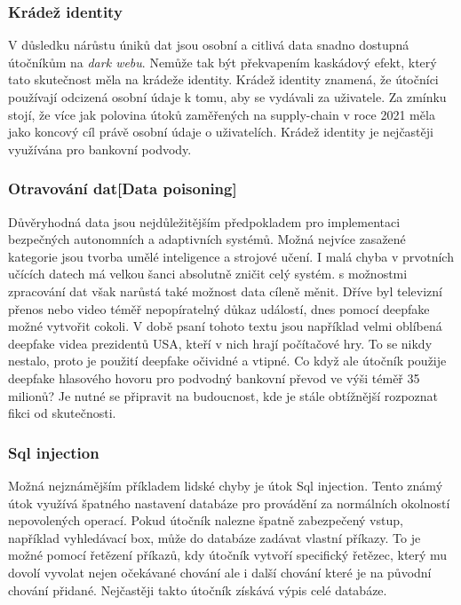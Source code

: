 \subsubsection{Krádež identity}
V důsledku nárůstu úniků dat jsou osobní a citlivá data snadno dostupná útočníkům na \textit{dark webu}.
Nemůže tak být překvapením kaskádový efekt, který tato skutečnost měla na krádeže identity.
Krádež identity znamená, že útočníci používají odcizená osobní údaje k tomu, aby se vydávali za uživatele.
Za zmínku stojí, že více jak polovina útoků zaměřených na supply-chain v roce 2021 měla jako koncový cíl právě osobní údaje o uživatelích.
Krádež identity je nejčastěji využívána pro bankovní podvody.\cite{Enisa_thread_landscape}

\subsubsection{Otravování dat[Data poisoning]}
Důvěryhodná data jsou nejdůležitějším předpokladem pro implementaci bezpečných autonomních a adaptivních systémů.
Možná nejvíce zasažené kategorie jsou tvorba umělé inteligence a strojové učení.
I malá chyba v prvotních učících datech má velkou šanci absolutně zničit celý systém.
s možnostmi zpracování dat však narůstá také možnost data cíleně měnit.
Dříve byl televizní přenos nebo video téměř nepopíratelný důkaz událostí, dnes pomocí deepfake možné vytvořit cokoli.
V době psaní tohoto textu jsou například velmi oblíbená deepfake videa prezidentů USA, kteří v nich hrají počítačové hry.
To se nikdy nestalo, proto je použití deepfake očividné a vtipné.
Co když ale útočník použije deepfake hlasového hovoru pro podvodný bankovní převod ve výši téměř 35 milionů?
Je nutné se připravit na budoucnost, kde je stále obtížnější rozpoznat fikci od skutečnosti.\cite{Enisa_thread_landscape}

\subsubsection{Sql injection}
Možná nejznámějším příkladem lidské chyby je útok Sql injection.
Tento známý útok využívá špatného nastavení databáze pro provádění za normálních okolností nepovolených operací.
Pokud útočník nalezne špatně zabezpečený vstup, například vyhledávací box, může do databáze zadávat vlastní příkazy.
To je možné pomocí řetězení příkazů, kdy útočník vytvoří specifický řetězec, který mu dovolí vyvolat nejen očekávané chování ale i další chování které je na původní chování přidané.
Nejčastěji takto útočník získává výpis celé databáze.\cite{cisco_most_common_attack}


